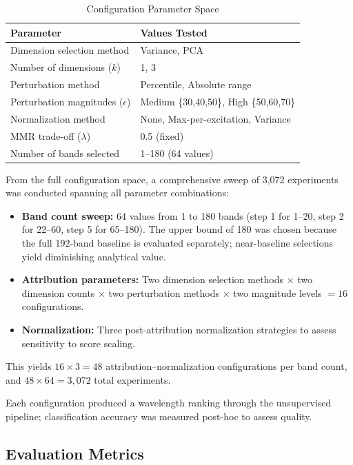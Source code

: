 \begin{table}[!t]
\centering
\caption{Configuration Parameter Space}
\label{tab:configs}
\begin{tabular}{@{}ll@{}}
\toprule
\textbf{Parameter} & \textbf{Values Tested} \\
\midrule
Dimension selection method & Variance, PCA \\
Number of dimensions ($k$) & 1, 3 \\
Perturbation method & Percentile, Absolute range \\
Perturbation magnitudes ($\epsilon$) & Medium \{30,40,50\}, High \{50,60,70\} \\
Normalization method & None, Max-per-excitation, Variance \\
MMR trade-off ($\lambda$) & 0.5 (fixed) \\
Number of bands selected & 1--180 (64 values) \\
\bottomrule
\end{tabular}
\end{table}

From the full configuration space, a comprehensive sweep of 3,072 experiments was conducted spanning all parameter combinations:
\begin{itemize}
    \item \textbf{Band count sweep:} 64 values from 1 to 180 bands (step 1 for 1--20, step 2 for 22--60, step 5 for 65--180). The upper bound of 180 was chosen because the full 192-band baseline is evaluated separately; near-baseline selections yield diminishing analytical value.
    \item \textbf{Attribution parameters:} Two dimension selection methods $\times$ two dimension counts $\times$ two perturbation methods $\times$ two magnitude levels $= 16$ configurations.
    \item \textbf{Normalization:} Three post-attribution normalization strategies to assess sensitivity to score scaling.
\end{itemize}
This yields $16 \times 3 = 48$ attribution--normalization configurations per band count, and $48 \times 64 = 3{,}072$ total experiments.

Each configuration produced a wavelength ranking through the unsupervised pipeline; classification accuracy was measured post-hoc to assess quality.

\subsection{Evaluation Metrics}
\label{sec:metrics}

